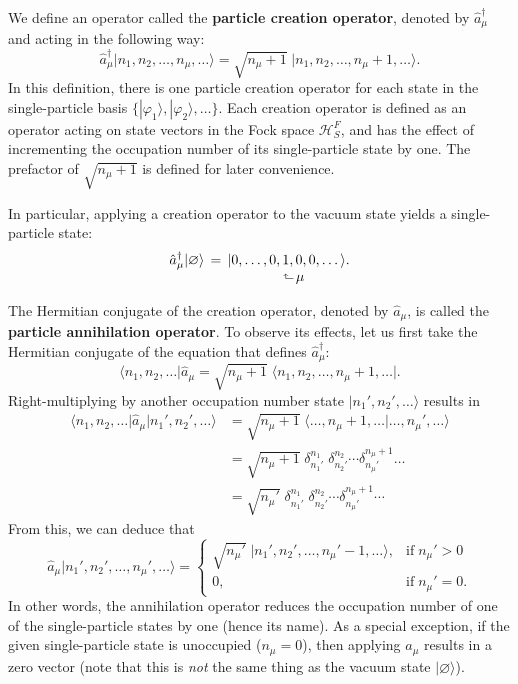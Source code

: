 \documentclass[pra,12pt]{revtex4}
\begin{document}
We define an operator called the \textbf{particle creation operator},
denoted by $\hat{a}_\mu^\dagger$ and acting in the following way:
$$\hat{a}_\mu^\dagger \big|n_1, n_2, \dots, n_\mu, \dots\big\rangle = \sqrt{n_\mu+1} \; \big|n_1, n_2, \dots, n_\mu + 1, \dots\big\rangle. $$
In this definition, there is one particle creation operator for each
state in the single-particle basis
$\{|\varphi_1\rangle,|\varphi_2\rangle,\dots\}$.  Each creation operator is
defined as an operator acting on state vectors in the Fock space
$\mathscr{H}^F_S$, and has the effect of incrementing the occupation
number of its single-particle state by one.  The prefactor of
$\sqrt{n_\mu+1}$ is defined for later convenience.

In particular, applying a creation operator to the vacuum state yields
a single-particle state:
$$\begin{aligned}\hat{a}_\mu^\dagger |\varnothing\rangle \, &= \, |0,\dots,0, 1, 0, 0, \dots\rangle. \\[-1ex] &\qquad\qquad\quad\;\;\rotatebox[origin=c]{90}{$\Rsh$}\,\mu
\end{aligned}$$

The Hermitian conjugate of the creation operator, denoted by $\hat{a}_\mu$,
is called the \textbf{particle annihilation operator}.  To observe its
effects, let us first take the Hermitian conjugate of the equation
that defines $\hat{a}_\mu^\dagger$:
$$\big\langle n_1, n_2, \dots\big| \hat{a}_\mu = \sqrt{n_\mu+1} \; \big\langle n_1, n_2, \dots, n_\mu + 1, \dots\big|. $$
Right-multiplying by another occupation number state
$|n_1',n_2',\dots\rangle$ results in
$$\begin{aligned}\big\langle n_1, n_2, \dots \big| \hat{a}_\mu \big|n_1',n_2',\dots\big\rangle &= \sqrt{n_\mu+1} \; \big\langle \dots, n_\mu + 1, \dots\big| \dots, n_\mu',\dots\big\rangle \\&= \sqrt{n_\mu+1}\; \delta^{n_1}_{n_1'}\; \delta^{n_2}_{n_2'} \cdots \delta^{n_\mu+1}_{n_\mu'} \dots \\  &= \sqrt{n_\mu'}\; \delta^{n_1}_{n_1'}\; \delta^{n_2}_{n_2'} \cdots \delta^{n_\mu+1}_{n_\mu'}\cdots\end{aligned}$$
From this, we can deduce that
$$\hat{a}_\mu \big|n_1', n_2', \dots, n_\mu', \dots\big\rangle = \begin{cases} \sqrt{n_\mu'} \; \big|n_1', n_2', \dots, n_\mu' - 1, \dots\big\rangle, & \mathrm{if}\; n_\mu' > 0 \\ 0, & \mathrm{if}\; n_\mu' = 0.\end{cases} $$
In other words, the annihilation operator reduces the occupation
number of one of the single-particle states by one (hence its name).
As a special exception, if the given single-particle state is
unoccupied ($n_\mu = 0$), then applying $\hat{a}_\mu$ results in a zero
vector (note that this is \textit{not} the same thing as the vacuum
state $|\varnothing\rangle$).
\end{document}
